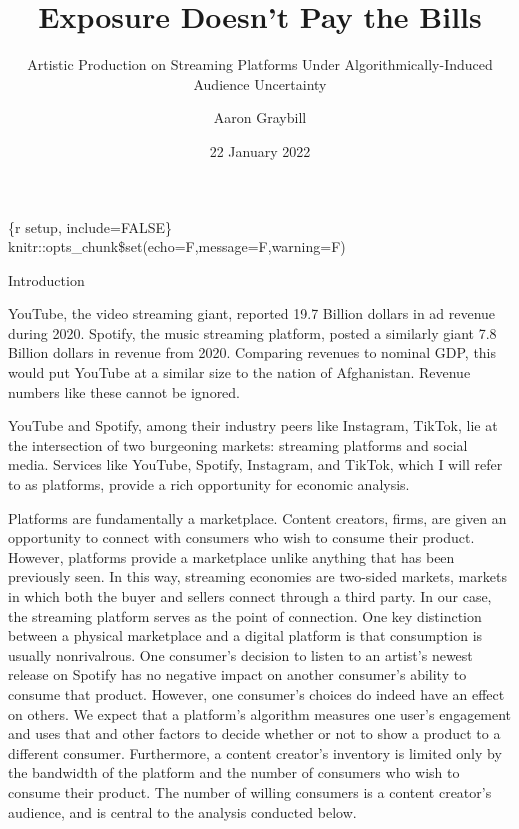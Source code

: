 \documentclass[
]{article}
\title{Exposure Doesn't Pay the Bills}
\subtitle{Artistic Production on Streaming Platforms Under
Algorithmically-Induced Audience Uncertainty}
\author{Aaron Graybill}
\date{22 January 2022}
\begin{document}
\maketitle

\{r setup, include=FALSE\}
knitr::opts\_chunk\$set(echo=F,message=F,warning=F)

Introduction

YouTube, the video streaming giant, reported 19.7 Billion dollars in ad
revenue during 2020. Spotify, the music streaming platform, posted a
similarly giant 7.8 Billion dollars in revenue from 2020. Comparing
revenues to nominal GDP, this would put YouTube at a similar size to the
nation of Afghanistan. Revenue numbers like these cannot be ignored.

YouTube and Spotify, among their industry peers like Instagram, TikTok,
lie at the intersection of two burgeoning markets: streaming platforms
and social media. Services like YouTube, Spotify, Instagram, and TikTok,
which I will refer to as platforms, provide a rich opportunity for
economic analysis.

Platforms are fundamentally a marketplace. Content creators, firms, are
given an opportunity to connect with consumers who wish to consume their
product. However, platforms provide a marketplace unlike anything that
has been previously seen. In this way, streaming economies are two-sided
markets, markets in which both the buyer and sellers connect through a
third party. In our case, the streaming platform serves as the point of
connection. One key distinction between a physical marketplace and a
digital platform is that consumption is usually nonrivalrous. One
consumer's decision to listen to an artist's newest release on Spotify
has no negative impact on another consumer's ability to consume that
product. However, one consumer's choices do indeed have an effect on
others. We expect that a platform's algorithm measures one user's
engagement and uses that and other factors to decide whether or not to
show a product to a different consumer. Furthermore, a content creator's
inventory is limited only by the bandwidth of the platform and the
number of consumers who wish to consume their product. The number of
willing consumers is a content creator's audience, and is central to the
analysis conducted below.
\end{document}
